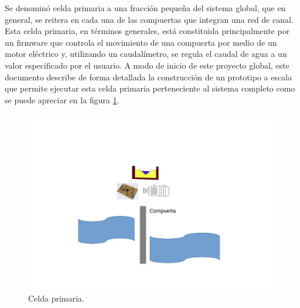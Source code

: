 Se denominó celda primaria a una fracción pequeña del sistema global, que en general, se reitera en cada una de las compuertas que integran una red de canal.
Esta celda primaria, en términos generales, está constituida principalmente por un firmware que controla el movimiento de una compuerta por medio de un motor eléctrico y, utilizando un caudalímetro, se regula el caudal de agua a un valor especificado por el usuario.
A modo de inicio de este proyecto global, este documento describe de forma detallada la construcción de un prototipo a escala que permite ejecutar esta celda primaria perteneciente al sistema completo como se puede apreciar en la figura \ref{fig:SistemaBase}.
\begin{figure}[htpb]
\centering
\includegraphics[scale=.40]{./Figures/SistemaBase-V2.jpg}
\caption{Celda primaria.}
\label{fig:SistemaBase}
\end{figure}



